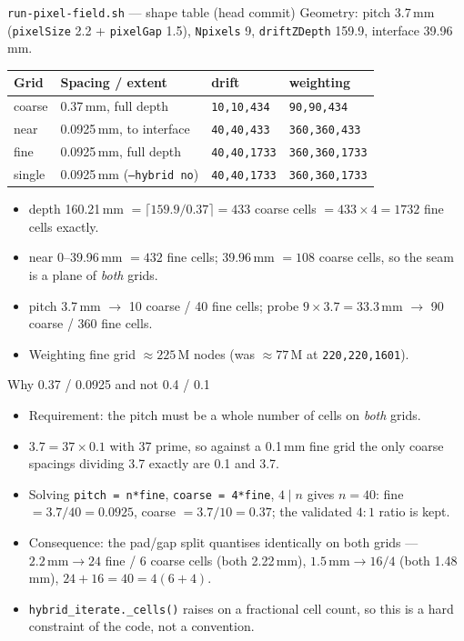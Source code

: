 \documentclass[10pt,aspectratio=169]{beamer}
\newcommand{\ti}[1]{\texttt{\footnotesize #1}}
\begin{document}
\begin{frame}[allowframebreaks]{\texttt{run-pixel-field.sh} --- shape table (head commit)}
  \small
  Geometry: pitch 3.7\,mm (\ti{pixelSize} 2.2 + \ti{pixelGap} 1.5), \ti{Npixels} 9,
  \ti{driftZDepth} 159.9, interface 39.96\,mm.
  \begin{center}
  \begin{tabular}{llll}
    \toprule
    Grid & Spacing / extent & drift & weighting \\
    \midrule
    coarse & 0.37\,mm, full depth      & \ti{10,10,434}  & \ti{90,90,434} \\
    near   & 0.0925\,mm, to interface  & \ti{40,40,433}  & \ti{360,360,433} \\
    fine   & 0.0925\,mm, full depth    & \ti{40,40,1733} & \ti{360,360,1733} \\
    single & 0.0925\,mm (\ti{--hybrid no}) & \ti{40,40,1733} & \ti{360,360,1733} \\
    \bottomrule
  \end{tabular}
  \end{center}
  \begin{itemize}\small
  \item depth 160.21\,mm $=\lceil 159.9/0.37\rceil = 433$ coarse cells $=433\times4=1732$
        fine cells exactly.
  \item near 0--39.96\,mm $=432$ fine cells; 39.96\,mm $=108$ coarse cells, so the seam is
        a plane of \emph{both} grids.
  \item pitch 3.7\,mm $\rightarrow$ 10 coarse / 40 fine cells;
        probe $9\times3.7=33.3$\,mm $\rightarrow$ 90 coarse / 360 fine cells.
  \item Weighting fine grid $\approx225$\,M nodes (was $\approx77$\,M at \ti{220,220,1601}).
  \end{itemize}
\end{frame}

\begin{frame}{Why 0.37 / 0.0925 and not 0.4 / 0.1}
  \begin{itemize}\small
  \item Requirement: the pitch must be a whole number of cells on \emph{both} grids.
  \item $3.7 = 37\times0.1$ with 37 prime, so against a 0.1\,mm fine grid the only coarse
        spacings dividing 3.7 exactly are 0.1 and 3.7.
  \item Solving \ti{pitch = n*fine}, \ti{coarse = 4*fine}, $4\mid n$ gives $n=40$:
        fine $=3.7/40=0.0925$, coarse $=3.7/10=0.37$; the validated $4{:}1$ ratio is kept.
  \item Consequence: the pad/gap split quantises identically on both grids ---
        $2.2\,\text{mm}\rightarrow24$ fine / 6 coarse cells (both 2.22\,mm),
        $1.5\,\text{mm}\rightarrow16/4$ (both 1.48\,mm), $24+16=40=4(6+4)$.
  \item \ti{hybrid\_iterate.\_cells()} raises on a fractional cell count, so this is a hard
        constraint of the code, not a convention.
  \end{itemize}
\end{frame}
\end{document}
